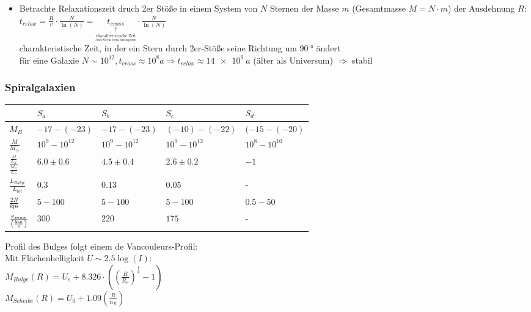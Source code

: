 \begin{itemize}
	\item Betrachte Relaxationszeit druch 2er Stöße in einem System von $N$ Sternen der Masse $m$ (Gesamtmasse $M=N\cdot m$) der Ausdehnung $R$: $t_{relax}=\frac{R}{v}\cdot\frac{N}{\ln(N)}=\underset{\underset{\underset{\text{eines Sterns beim durchqueren}}{\text{charakteristische Zeit}}}{\uparrow}}{t_{cross}}\cdot\frac{N}{\ln(N)}$\\
		charakteristische Zeit, in der ein Stern durch 2er-Stöße  seine Richtung um $\SI{90}{\degree}$ ändert\\
		für eine Galaxie $N\sim 10^{12}, t_{cross}\approx 10^8\si{a}\Rightarrow t_{relax}\approx\SI{14e9}{a}$ (älter als Universum) $\Rightarrow $ stabil
\end{itemize}
\subsubsection{Spiralgalaxien}
\begin{table}[H]
	\def\k{2.3cm}
	\begin{tabular}{p{\k}|p{\k}|p{\k}|p{\k}|p{\k}}
		& $S_a$ & $S_b$ & $S_c$ & $S_{d}$ \\\hline
		$M_B$ & $-\num{17}-(-\num{23})$ & $-\num{17}-(-\num{23})$ & $(-\num{10})-(-\num{22})$ & $(-\num{15}-(-\num{20})$ \\\hline
		$\frac{M}{M_\odot}$ & $10^9-10^{12}$ & $10^9-10^{12}$ & $10^9-10^{12}$ & $10^8-10^{10}$ \\\hline
		$\frac{\frac{M}{L_B}}{\frac{M_\odot}{L_\odot}}$ & $\num{6.0}\pm\num{0.6}$ & $\num{4.5}\pm\num{0.4}$ & $\num{2.6}\pm\num{0.2}$ & $-\num{1}$ \\\hline
		$\frac{L_{Bulge}}{L_{tot}}$ & $\num{0.3}$ & $\num{0.13}$ & $\num{0.05}$ & - \\\hline
		$\frac{2R}{\si{k\ps}}$ & $\num{5}-\num{100}$ & $\num{5}-\num{100}$ & $\num{5}-\num{100}$ & $\num{0.5}-\num{50}$ \\\hline
		$\frac{v_{max}}{\left(\si{\frac{\km}{\s}}\right)}$ & $\num{300}$ & $\num{220}$ & $\num{175}$ & - 
	\end{tabular}
\end{table}
Profil des Bulges folgt einem de Vancouleurs-Profil:\\
Mit Flächenhelligkeit $U\sim\num{2.5}\log(I):$\\
$M_{Bulge}(R)=U_e+\num{8.326}\cdot\left(\left(\frac{R}{R_e}\right)^\frac{1}{4}-1\right)$\\
$M_{Scheibe}(R)=U_0+\num{1.09}\left(\frac{R}{n_R}\right)$\\
